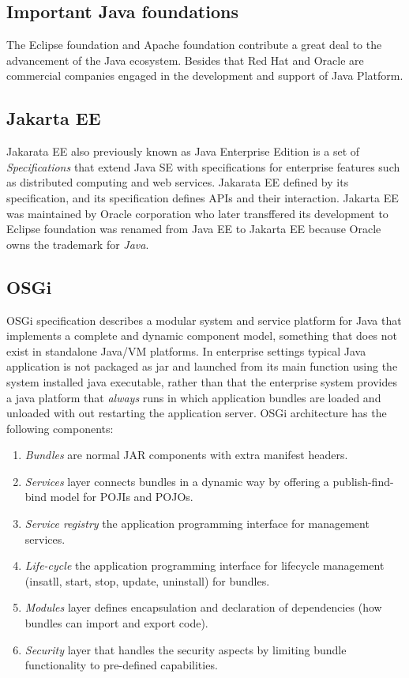 \documentclass[a4paper]{article}
\begin{document}
\subsection*{Important Java foundations}
The Eclipse foundation and Apache foundation contribute a great deal to the advancement of the Java ecosystem.
Besides that Red Hat and Oracle are commercial companies engaged in the development and support of Java Platform.

\subsection*{Jakarta EE}
Jakarata EE also previously known as Java Enterprise Edition is a set of \emph{Specifications} that extend Java SE
with specifications for enterprise features such as distributed computing and web services. Jakarata EE defined by 
its specification, and its specification defines APIs and their interaction. Jakarta EE was maintained by Oracle
corporation who later transffered its development to Eclipse foundation was renamed from Java EE to Jakarta EE because
Oracle owns the trademark for \emph{Java}. 

\subsection*{OSGi}

OSGi specification describes a modular system and service platform for Java that implements a complete and 
dynamic component model, something that does not exist in standalone Java/VM platforms. In enterprise settings typical 
Java application is not packaged as jar and launched from its main function using the system installed java executable,
rather than that the enterprise system provides a java platform that \emph{always} runs in which application bundles are
loaded and unloaded with out restarting the application server. OSGi architecture has the following components:

\begin{enumerate}
    \item \emph{Bundles} are normal JAR components with extra manifest headers.
    \item \emph{Services} layer connects bundles in a dynamic way by offering a publish-find-bind model for POJIs and POJOs.
    \item \emph{Service registry} the application programming interface for management services.
    \item \emph{Life-cycle} the application programming interface for lifecycle management (insatll, start, stop, update, uninstall)
          for bundles.
    \item \emph{Modules} layer defines encapsulation and declaration of dependencies (how bundles can import and export code).
    \item \emph{Security} layer that handles the security aspects by limiting bundle functionality to pre-defined capabilities.
\end{enumerate}
\end{document}
